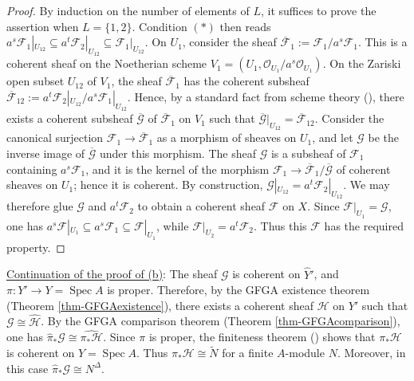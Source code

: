 \documentclass[a4paper,12pt, dvipdfmx]{jsbook}
\def\O{\mathscr{O}}
\def\til#1{\widetilde{#1}}%
\def\ovl#1{\overline{#1}}%
\def\Spec{\mathop{\mathrm{Spec}}\nolimits}
\theoremstyle{plain}
\theoremstyle{definition}
\begin{document}
\begin{proof}[Proof]
By induction on the number of elements of $L$, it suffices to prove the assertion when $L=\{1,2\}$.
Condition $(\ast)$ then reads $a^s\mathscr{F}_1|_{U_{12}}\subseteq a^t\mathscr{F}_2|_{U_{12}}\subseteq\mathscr{F}_1|_{U_{12}}$.
On $U_1$, consider the sheaf $\ovl{\mathscr{F}}_1:=\mathscr{F}_1/a^s\mathscr{F}_1$.
This is a coherent sheaf on the Noetherian scheme $V_1=(U_1,\O_{U_1}/a^s\O_{U_1})$.
On the Zariski open subset $U_{12}$ of $V_1$, the sheaf $\ovl{\mathscr{F}}_1$ has the coherent subsheaf $\ovl{\mathscr{F}}_{12}:=a^t\mathscr{F}_2|_{U_{12}}/a^s\mathscr{F}_1|_{U_{12}}$.
Hence, by a standard fact from scheme theory (\cite[Chap.\ II, Exercise 5.15 (d)]{Hart2}), there exists a coherent subsheaf $\ovl{\mathscr{G}}$ of $\ovl{\mathscr{F}}_1$ on $V_1$ such that $\ovl{\mathscr{G}}|_{U_{12}}=\ovl{\mathscr{F}}_{12}$.
Consider the canonical surjection $\mathscr{F}_1\rightarrow\ovl{\mathscr{F}}_1$ as a morphism of sheaves on $U_1$, and let $\mathscr{G}$ be the inverse image of $\ovl{\mathscr{G}}$ under this morphism.
The sheaf $\mathscr{G}$ is a subsheaf of $\mathscr{F}_1$ containing $a^s\mathscr{F}_1$, and it is the kernel of the morphism $\mathscr{F}_1\rightarrow\ovl{\mathscr{F}}_1/\ovl{\mathscr{G}}$ of coherent sheaves on $U_1$; hence it is coherent.
By construction, $\mathscr{G}|_{U_{12}}=a^t\mathscr{F}_2|_{U_{12}}$.
We may therefore glue $\mathscr{G}$ and $a^t\mathscr{F}_2$ to obtain a coherent sheaf $\mathscr{F}$ on $X$.
Since $\mathscr{F}|_{U_1}=\mathscr{G}$, one has $a^s\mathscr{F}|_{U_1}\subseteq a^s\mathscr{F}_1\subseteq\mathscr{F}|_{U_1}$, while $\mathscr{F}|_{U_2}=a^t\mathscr{F}_2$.
Thus this $\mathscr{F}$ has the required property.
\end{proof}

\medskip\noindent
\underline{Continuation of the proof of (b)}: The sheaf $\mathscr{G}$ is coherent on $\widehat{Y}'$, and $\pi\colon Y'\rightarrow Y=\Spec A$ is proper.
Therefore, by the GFGA existence theorem (Theorem \ref{thm-GFGAexistence}), there exists a coherent sheaf $\mathscr{H}$ on $Y'$ such that $\mathscr{G}\cong\widehat{\mathscr{H}}$.
By the GFGA comparison theorem (Theorem \ref{thm-GFGAcomparison}), one has $\widehat{\pi}_{\ast}\mathscr{G}\cong\widehat{\pi_{\ast}\mathscr{H}}$.
Since $\pi$ is proper, the finiteness theorem (\cite[Chap.\ III, Theorem 8.8, Remark 8.8.1]{Hart2}) shows that $\pi_{\ast}\mathscr{H}$ is coherent on $Y=\Spec A$.
Thus $\pi_{\ast}\mathscr{H}\cong\til{N}$ for a finite $A$-module $N$.
Moreover, in this case $\widehat{\pi}_{\ast}\mathscr{G}\cong N^{\Delta}$.
\end{document}

